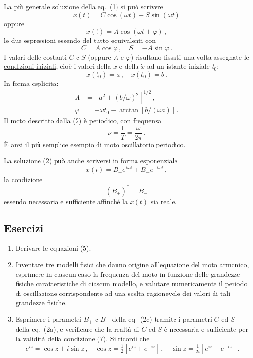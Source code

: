 \documentclass[11pt, a4paper]{book}
\numberwithin{equation}{section}
\newenvironment{esercizi}{\subsection*{Esercizi}\begin{enumerate}}{\end{enumerate}}
\begin{document}
La più generale soluzione della eq.~(1) si può scrivere
\begin{equation}
    x(t) = C \cos(\omega t) + S \sin(\omega t) \tag{2a}
\end{equation}
oppure
\begin{equation}
    x(t) = A \cos(\omega t + \varphi) \,, \tag{2b}
\end{equation}
le due espressioni essendo del tutto equivalenti con
\begin{equation}
    C = A \cos\varphi \,, \quad S = -A \sin\varphi \,.
\end{equation}
I valori delle costanti $C$ e $S$ (oppure $A$ e $\varphi$) risultano fissati una volta assegnate le \uline{condizioni iniziali}, cioè i valori della $x$ e della $\dot{x}$ ad un istante iniziale $t_0$:
\begin{equation}
    x(t_0) = a \,, \quad \dot{x}(t_0) = b \,.
\end{equation}
In forma esplicita:
\begin{align}
    A &= \left[ a^2 + (b/\omega)^2 \right]^{1/2} \,, \tag{5a} \\
    \varphi &= -\omega t_0 - \arctan\left[ b/(\omega a) \right] \,. \tag{5b}
\end{align}
Il moto descritto dalla (2) è periodico, con frequenza
\begin{equation}
    \nu = \frac{1}{T} = \frac{\omega}{2\pi} \,.
\end{equation}
È anzi il più semplice esempio di moto oscillatorio periodico.

La soluzione (2) può anche scriversi in forma esponenziale
\begin{equation}
    x(t) = B_+ e^{i\omega t} + B_- e^{-i\omega t} \,, \tag{2c}
\end{equation}
la condizione
\begin{equation}
    \left( B_+ \right)^* = B_-
\end{equation}
essendo necessaria e sufficiente affinché la $x(t)$ sia reale.

\begin{esercizi}
    \item Derivare le equazioni (5).
    \item Inventare tre modelli fisici che danno origine all'equazione del moto armonico, esprimere in ciascun caso la frequenza del moto in funzione delle grandezze fisiche caratteristiche di ciascun modello, e valutare numericamente il periodo di oscillazione corrispondente ad una scelta ragionevole dei valori di tali grandezze fisiche.
    \item Esprimere i parametri $B_+$ e $B_-$ della eq.~(2c) tramite i parametri $C$ ed $S$ della eq.~(2a), e verificare che la realtà di $C$ ed $S$ è necessaria e sufficiente per la validità della condizione (7). Si ricordi che
    \[
        e^{iz} = \cos z + i \sin z \,, \quad
        \cos z = \tfrac{1}{2}\left[ e^{iz} + e^{-iz} \right] \,, \quad
        \sin z = \tfrac{1}{2i}\left[ e^{iz} - e^{-iz} \right] \,.
    \]
\end{esercizi}
\end{document}
